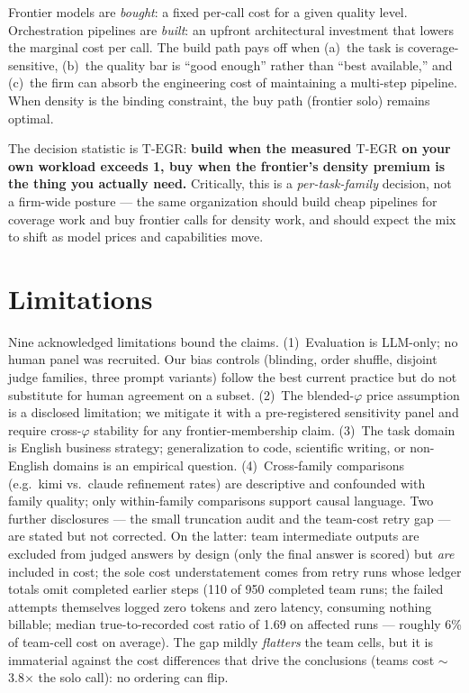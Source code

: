 \documentclass[12pt,a4paper]{article}
\newcommand{\phiBlend}{\varphi}
\newcommand{\TEGR}{\ensuremath{\text{T-EGR}}}
\begin{document}
Frontier models are \emph{bought}: a fixed per-call cost for a given quality
level. Orchestration pipelines are \emph{built}: an upfront architectural
investment that lowers the marginal cost per call. The build path pays off when
(a)~the task is coverage-sensitive, (b)~the quality bar is ``good enough'' rather
than ``best available,'' and (c)~the firm can absorb the engineering cost of
maintaining a multi-step pipeline. When density is the binding constraint, the buy
path (frontier solo) remains optimal.

The decision statistic is $\TEGR$: \textbf{build when the measured $\TEGR$ on your
own workload exceeds 1, buy when the frontier's density premium is the thing you
actually need.} Critically, this is a \emph{per-task-family} decision, not a
firm-wide posture --- the same organization should build cheap pipelines for
coverage work and buy frontier calls for density work, and should expect the mix
to shift as model prices and capabilities move.

\section{Limitations}\label{sec:limitations}

Nine acknowledged limitations bound the claims. (1)~Evaluation is LLM-only; no
human panel was recruited. Our bias controls (blinding, order shuffle, disjoint
judge families, three prompt variants) follow the best current practice
\citep{ZhengEtAl2023, VergaEtAl2024} but do not substitute for human agreement
on a subset. (2)~The blended-$\phiBlend$ price assumption is a disclosed
limitation; we mitigate it with a pre-registered sensitivity panel and require
cross-$\phiBlend$ stability for any frontier-membership claim. (3)~The task
domain is English business strategy; generalization to code, scientific writing,
or non-English domains is an empirical question. (4)~Cross-family comparisons
(e.g.\ kimi vs.\ claude refinement rates) are descriptive and confounded with
family quality; only within-family comparisons support causal language. Two
further disclosures --- the small truncation audit and the team-cost retry gap
--- are stated but not corrected. On the latter: team intermediate outputs are
excluded from judged answers by design (only the final answer is scored) but
\emph{are} included in cost; the sole cost understatement comes from retry
runs whose ledger totals omit completed earlier steps (110 of 950 completed
team runs; the failed attempts themselves logged zero tokens and zero latency,
consuming nothing billable; median true-to-recorded cost ratio of 1.69 on
affected runs ---
roughly 6\% of team-cell cost on average). The gap mildly \emph{flatters} the
team cells, but it is immaterial against the cost differences that drive the
conclusions (teams cost $\sim$3.8$\times$ the solo call): no ordering can
flip.
\end{document}
